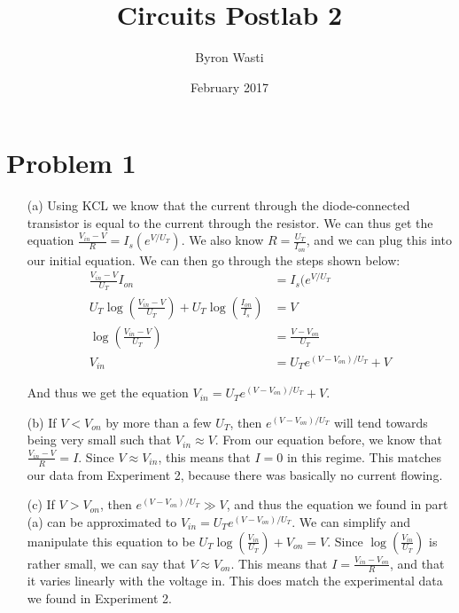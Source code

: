 \documentclass{article}
\title{Circuits Postlab 2}
\author{Byron Wasti}
\date{February 2017}
\begin{document}
\maketitle

\section{Problem 1}

\begin{itemize}
    \item[(a)] Using KCL we know that the current through the diode-connected transistor is equal to the current through the resistor. We can thus get the equation $\frac{V_{in} - V}{R} = I_s(e^{V/U_T})$. We also know $R = \frac{U_T}{I_{on}}$, and we can plug this into our initial equation. We can then go through the steps shown below:
        \begin{align*}
            \frac{V_{in} - V}{U_T}I_{on} &= I_s(e^{V/U_T}\\
            U_T\log(\frac{V_{in} - V}{U_T}) + U_T\log(\frac{I_{on}}{I_s}) &= V\\
            \log(\frac{V_{in} - V}{U_T}) &= \frac{V - V_{on}}{U_T}\\
            V_{in} &= U_Te^{(V-V_{on})/U_T} + V
        \end{align*}

        And thus we get the equation $V_{in} = U_Te^{(V-V_{on})/U_T} + V$.

    \item[(b)] If $V < V_{on}$ by more than a few $U_T$, then $e^{(V - V_{on})/U_T}$ will tend towards being very small such that $V_{in} \approx V$. From our equation before, we know that $\frac{V_{in} - V}{R} = I$. Since $V \approx V_{in}$, this means that $I = 0$ in this regime. This matches our data from Experiment 2, because there was basically no current flowing.
    
    \item[(c)] If $V > V_{on}$, then $e^{(V - V_{on})/U_T} \gg V$, and thus the equation we found in part (a) can be approximated to $V_{in} = U_Te^{(V - V_{on})/U_T}$.  We can simplify and manipulate this equation to be $U_T\log(\frac{V_{in}}{U_T}) + V_{on} = V$. Since $\log(\frac{V_{in}}{U_T})$ is rather small, we can say that $V \approx V_{on}$. This means that $I = \frac{V_{in} - V_{on}}{R}$, and that it varies linearly with the voltage in. This does match the experimental data we found in Experiment 2.

\end{itemize}
\end{document}
